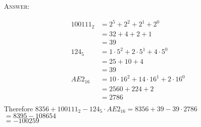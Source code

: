 \textsc{Answer:}\vspace{-2mm}
\begin{answerlong}
    \begin{align*}
      100111_{2}    &= 2^{5} + 2^{2} + 2^{1} + 2^{0} \\
                    &= 32 + 4 + 2 + 1\\
                    &= 39\\
         124_{5}    &= 1 \cdot 5^{2} + 2 \cdot 5^{1} + 4 \cdot 5^{0} \\
                    &= 25 + 10 + 4 \\
                    &= 39 \\
        AE2_{16}    &= 10 \cdot 16^{2} + 14 \cdot 16^{1} + 2 \cdot 16^{0} \\
                    &= 2560 + 224 + 2 \\
                    &= 2786 \\
    \end{align*}
    Therefore $8356 + 100111_{2} - 124_{5} \cdot AE2_{16} = 8356 + 39 - 39 \cdot 2786$\\
              $= 8395 - 108654$ \\
              $= -100259$ \\

\end{answerlong}
  
